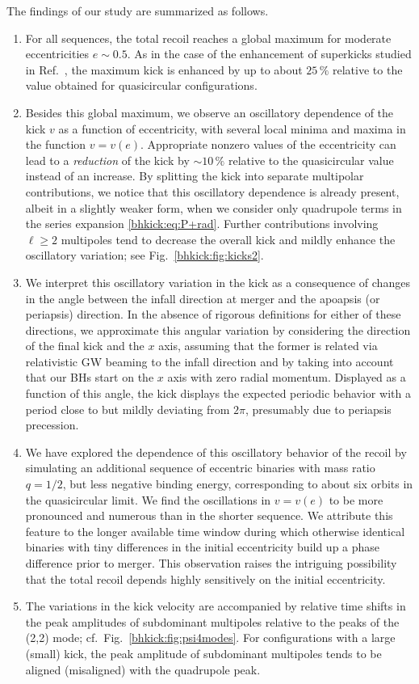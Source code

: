 The findings of our study are summarized as follows.
%
\begin{enumerate}
 \item For all sequences, the total recoil reaches
 a global maximum for moderate eccentricities $e \sim 0.5$.
 As in the case of the enhancement of superkicks studied
 in Ref.~\cite{Sperhake:2019wwo}, the maximum kick is
 enhanced by up to about $25\,\%$ relative to the value obtained
 for quasicircular configurations.
\item Besides this global maximum, we observe an oscillatory
  dependence of the kick $v$ as a function of eccentricity, with
  several local minima and maxima in the function $v = v(e)$. Appropriate
  nonzero values of the eccentricity can lead to a
  {\it reduction} of the kick by $\sim 10\,\%$ relative to the quasicircular
  value instead of an increase. By
  splitting the kick into separate multipolar contributions, we notice
  that this oscillatory dependence is already present, albeit in a
  slightly weaker form, when we consider only quadrupole terms in the
  series expansion \eqref{bhkick:eq:P+rad}.  Further contributions involving
  $\ell \ge 2$ multipoles tend to decrease the overall kick and mildly
  enhance the oscillatory variation; see Fig.~\ref{bhkick:fig:kicks2}.
 \item We interpret this oscillatory variation in the kick
 as a consequence of changes in the angle between the infall
 direction at merger and the apoapsis (or periapsis)
 direction. In the absence of rigorous definitions for either
 of these directions, we approximate this angular variation
 by considering the direction of the final kick and the
 $x$ axis, assuming that the former is related via relativistic
 GW beaming to the infall direction and by taking into account
 that our BHs start on the $x$ axis with zero radial momentum.
 Displayed as a function of this angle, the kick displays
 the expected periodic behavior with a period close to but
 mildly deviating from $2\pi$, presumably due to periapsis
 precession.
 \item We have explored the dependence of this oscillatory behavior
 of the recoil by simulating an additional sequence of eccentric
 binaries with mass ratio $q=1/2$, but less negative binding energy,
 corresponding to about six orbits in the quasicircular limit.
 We find the oscillations in $v=v(e)$ to be more pronounced
 and numerous than in the shorter sequence. We attribute this
 feature to the longer available time window during which otherwise
 identical binaries with tiny differences in the initial
 eccentricity build up a phase difference prior to merger.
 This observation raises the intriguing possibility that the
 total recoil depends highly sensitively on the initial eccentricity.
 \item The variations in the kick velocity are accompanied by
 relative time shifts in the peak amplitudes of subdominant
 multipoles relative to the peaks of the (2,2) mode;
 cf.~Fig.~\ref{bhkick:fig:psi4modes}. For configurations with a large (small)
 kick, the peak amplitude of subdominant multipoles tends to
 be aligned (misaligned) with the quadrupole peak.
\end{enumerate}
